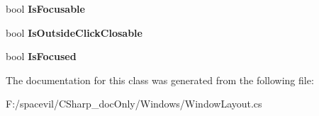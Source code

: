 \begin{DoxyCompactItemize}
\item 
\mbox{\label{class_space_v_i_l_1_1_window_layout_a1cc44d8b7c6128fc32540dc01b5d33c1}} 
bool {\bfseries Is\+Focusable}
\item 
\mbox{\label{class_space_v_i_l_1_1_window_layout_a9b83150f4ba045500b3f92b3ab96645c}} 
bool {\bfseries Is\+Outside\+Click\+Closable}
\item 
\mbox{\label{class_space_v_i_l_1_1_window_layout_a4e6054ac82ea13692ad1c0c9c8c5a12c}} 
bool {\bfseries Is\+Focused}
\end{DoxyCompactItemize}


The documentation for this class was generated from the following file\+:\begin{DoxyCompactItemize}
\item 
F\+:/spacevil/\+C\+Sharp\+\_\+doc\+Only/\+Windows/Window\+Layout.\+cs\end{DoxyCompactItemize}
